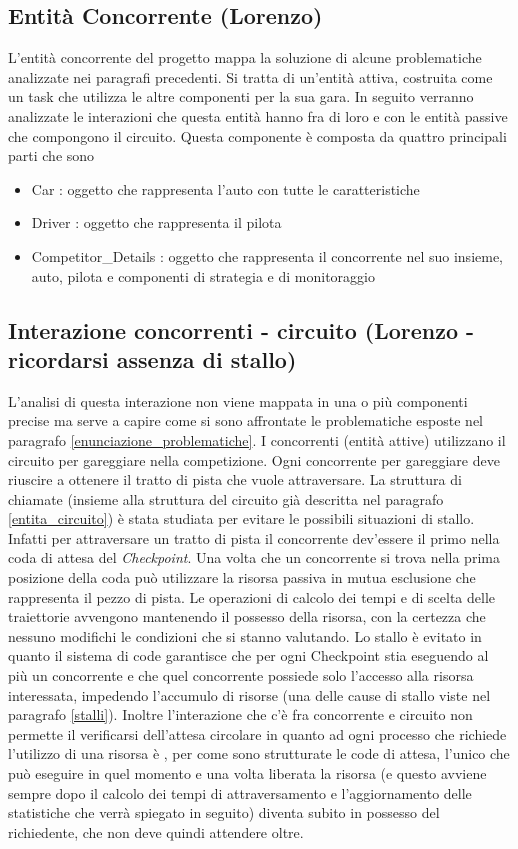 \subsection{Entit\`{a} Concorrente (Lorenzo)}
L'entità concorrente del progetto mappa la soluzione di alcune problematiche analizzate nei paragrafi precedenti. Si tratta di un'entità attiva, costruita come un task che utilizza le altre componenti per la sua gara. In seguito verranno analizzate le interazioni che questa entità hanno fra di loro e con le entità passive che compongono il circuito.
Questa componente è composta da quattro principali parti che sono
\begin{itemize}
\item Car : oggetto che rappresenta l'auto con tutte le caratteristiche
\item Driver : oggetto che rappresenta il pilota
\item Competitor\_Details : oggetto che rappresenta il concorrente nel suo insieme, auto, pilota e componenti di strategia e di monitoraggio
\end{itemize}
\subsection{Interazione concorrenti - circuito (Lorenzo - ricordarsi assenza di stallo)}
L'analisi di questa interazione non viene mappata in una o più componenti precise ma serve a capire come si sono affrontate le problematiche esposte nel paragrafo \ref{enunciazione_problematiche}. I concorrenti (entità attive) utilizzano il circuito per gareggiare nella competizione.
Ogni concorrente per gareggiare deve riuscire a ottenere il tratto di pista che vuole attraversare. La struttura di chiamate (insieme alla struttura del circuito già descritta nel paragrafo \ref{entita_circuito}) è stata studiata per evitare le possibili situazioni di stallo. Infatti per attraversare un tratto di pista il concorrente dev'essere il primo nella coda di attesa del \emph{Checkpoint}. Una volta che un concorrente si trova nella prima posizione della coda può utilizzare la risorsa passiva in mutua esclusione che rappresenta il pezzo di pista. Le operazioni di calcolo dei tempi e di scelta delle traiettorie avvengono mantenendo il possesso della risorsa, con la certezza che nessuno modifichi le condizioni che si stanno valutando. Lo stallo è evitato in quanto il sistema di code garantisce che per ogni Checkpoint stia eseguendo al più un concorrente e che quel concorrente possiede solo l'accesso alla risorsa interessata, impedendo l'accumulo di risorse (una delle cause di stallo viste nel paragrafo \ref{stalli}). Inoltre l'interazione che c'è fra concorrente e circuito non permette il verificarsi dell'attesa circolare in quanto ad ogni processo che richiede l'utilizzo di una risorsa è , per come sono strutturate le code di attesa, l'unico che può eseguire in quel momento e una volta liberata la risorsa (e questo avviene sempre dopo il calcolo dei tempi di attraversamento e l'aggiornamento delle statistiche che verrà spiegato in seguito) diventa subito in possesso del richiedente, che non deve quindi attendere oltre. 
